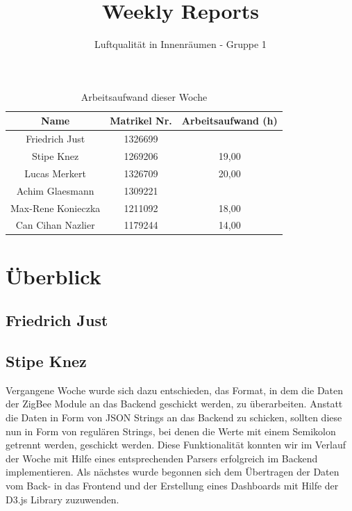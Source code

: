 \documentclass[]{article}
\title{Weekly Reports}
\author{Luftqualität in Innenräumen - Gruppe 1}
\begin{document}
\maketitle

\begin{table}[h!]
	\centering
	\begin{tabular}{|c|c|c|}
		\hline
		{\textbf{Name}}				&		{\textbf{Matrikel Nr.}} & {\textbf{Arbeitsaufwand (h)}} \\
		\hline
		Friedrich Just				&		1326699 				&		\\
		\hline
		Stipe Knez					&		1269206 				&	19,00	\\
		\hline
		Lucas Merkert				&		1326709					&	20,00	\\
		\hline
		Achim Glaesmann				&		1309221					&		\\
		\hline
		Max-Rene Konieczka			&		1211092					&	18,00	\\
		\hline
		Can Cihan Nazlier			&		1179244					&	14,00	\\
		\hline
	\end{tabular}
	\caption{Arbeitsaufwand dieser Woche}
	\label{tab:worakload}
\end{table}



\section{Überblick}


\subsection{Friedrich Just}



\subsection{Stipe Knez}
Vergangene Woche wurde sich dazu entschieden, das Format, in dem die Daten der ZigBee Module an das Backend geschickt werden, zu überarbeiten. Anstatt die Daten in Form von JSON Strings an das Backend zu schicken, sollten diese nun in Form von regulären Strings, bei denen die Werte mit einem Semikolon getrennt werden, geschickt werden. Diese Funktionalität konnten wir im Verlauf der Woche mit Hilfe eines entsprechenden Parsers erfolgreich im Backend implementieren. Als nächstes wurde begonnen sich dem Übertragen der Daten vom Back- in das Frontend und der Erstellung eines Dashboards mit Hilfe der D3.js Library zuzuwenden.
\end{document}
